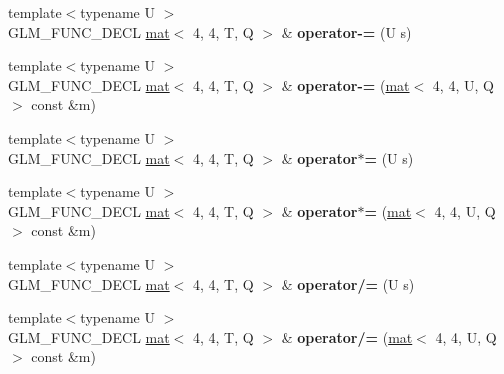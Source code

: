 \begin{DoxyCompactItemize}
{\footnotesize template$<$typename U $>$ }\\G\+L\+M\+\_\+\+F\+U\+N\+C\+\_\+\+D\+E\+CL \hyperlink{structglm_1_1mat}{mat}$<$ 4, 4, T, Q $>$ \& {\bfseries operator-\/=} (U s)
\item 
\mbox{\label{structglm_1_1mat_3_014_00_014_00_01T_00_01Q_01_4_a63a67f742e051a407c621365d67af38a}} 
{\footnotesize template$<$typename U $>$ }\\G\+L\+M\+\_\+\+F\+U\+N\+C\+\_\+\+D\+E\+CL \hyperlink{structglm_1_1mat}{mat}$<$ 4, 4, T, Q $>$ \& {\bfseries operator-\/=} (\hyperlink{structglm_1_1mat}{mat}$<$ 4, 4, U, Q $>$ const \&m)
\item 
\mbox{\label{structglm_1_1mat_3_014_00_014_00_01T_00_01Q_01_4_a431d493d66da8eeb6f7b94f97e40f420}} 
{\footnotesize template$<$typename U $>$ }\\G\+L\+M\+\_\+\+F\+U\+N\+C\+\_\+\+D\+E\+CL \hyperlink{structglm_1_1mat}{mat}$<$ 4, 4, T, Q $>$ \& {\bfseries operator$\ast$=} (U s)
\item 
\mbox{\label{structglm_1_1mat_3_014_00_014_00_01T_00_01Q_01_4_a2b2e2159f3d8ae83016b90f092a3be1f}} 
{\footnotesize template$<$typename U $>$ }\\G\+L\+M\+\_\+\+F\+U\+N\+C\+\_\+\+D\+E\+CL \hyperlink{structglm_1_1mat}{mat}$<$ 4, 4, T, Q $>$ \& {\bfseries operator$\ast$=} (\hyperlink{structglm_1_1mat}{mat}$<$ 4, 4, U, Q $>$ const \&m)
\item 
\mbox{\label{structglm_1_1mat_3_014_00_014_00_01T_00_01Q_01_4_a518f7ffaaea8e439f279bf319977b9ca}} 
{\footnotesize template$<$typename U $>$ }\\G\+L\+M\+\_\+\+F\+U\+N\+C\+\_\+\+D\+E\+CL \hyperlink{structglm_1_1mat}{mat}$<$ 4, 4, T, Q $>$ \& {\bfseries operator/=} (U s)
\item 
\mbox{\label{structglm_1_1mat_3_014_00_014_00_01T_00_01Q_01_4_ad786f3d74c405ba7fb25905a8c0e1705}} 
{\footnotesize template$<$typename U $>$ }\\G\+L\+M\+\_\+\+F\+U\+N\+C\+\_\+\+D\+E\+CL \hyperlink{structglm_1_1mat}{mat}$<$ 4, 4, T, Q $>$ \& {\bfseries operator/=} (\hyperlink{structglm_1_1mat}{mat}$<$ 4, 4, U, Q $>$ const \&m)

\end{DoxyCompactItemize}
